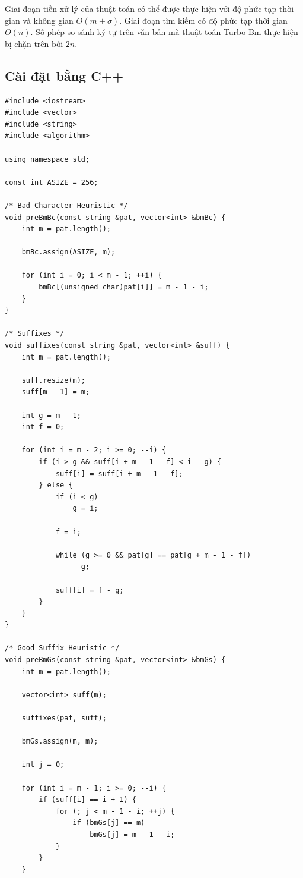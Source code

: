Giai đoạn tiền xử lý của thuật toán có thể được thực hiện với độ phức tạp thời 
gian và không gian $O(m + \sigma)$. Giai đoạn tìm kiếm có độ phức tạp thời gian 
$O(n)$. Số phép so sánh ký tự trên văn bản mà thuật toán Turbo-Bm thực hiện bị 
chặn trên bởi $2n$.

\subsection{Cài đặt bằng C++}

\begin{verbatim}
#include <iostream>
#include <vector>
#include <string>
#include <algorithm>

using namespace std;

const int ASIZE = 256;

/* Bad Character Heuristic */
void preBmBc(const string &pat, vector<int> &bmBc) {
    int m = pat.length();

    bmBc.assign(ASIZE, m);

    for (int i = 0; i < m - 1; ++i) {
        bmBc[(unsigned char)pat[i]] = m - 1 - i;
    }
}

/* Suffixes */
void suffixes(const string &pat, vector<int> &suff) {
    int m = pat.length();

    suff.resize(m);
    suff[m - 1] = m;

    int g = m - 1;
    int f = 0;

    for (int i = m - 2; i >= 0; --i) {
        if (i > g && suff[i + m - 1 - f] < i - g) {
            suff[i] = suff[i + m - 1 - f];
        } else {
            if (i < g)
                g = i;

            f = i;

            while (g >= 0 && pat[g] == pat[g + m - 1 - f])
                --g;

            suff[i] = f - g;
        }
    }
}

/* Good Suffix Heuristic */
void preBmGs(const string &pat, vector<int> &bmGs) {
    int m = pat.length();

    vector<int> suff(m);

    suffixes(pat, suff);

    bmGs.assign(m, m);

    int j = 0;

    for (int i = m - 1; i >= 0; --i) {
        if (suff[i] == i + 1) {
            for (; j < m - 1 - i; ++j) {
                if (bmGs[j] == m)
                    bmGs[j] = m - 1 - i;
            }
        }
    }


\end{verbatim}
